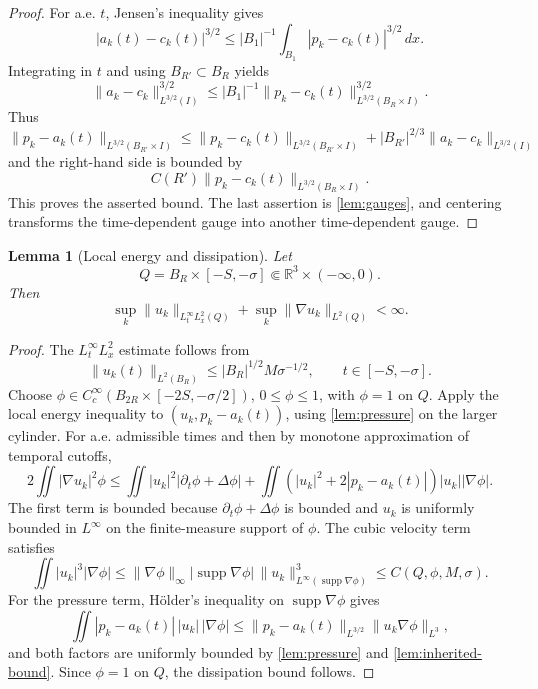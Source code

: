 \documentclass[11pt]{amsart}
\theoremstyle{plain}
\newtheorem{lemma}[theorem]{Lemma}
\theoremstyle{definition}
\theoremstyle{remark}
\numberwithin{equation}{section}
\newcommand{\R}{\mathbb R}
\newcommand{\supp}{\operatorname{supp}}
\begin{document}
\begin{proof}
For a.e. \(t\), Jensen's inequality gives
\[
   |a_k(t)-c_k(t)|^{3/2}
   \le |B_1|^{-1}\int_{B_1}|p_k-c_k(t)|^{3/2}\,dx .
\]
Integrating in \(t\) and using \(B_{R'}\subset B_R\) yields
\[
   \|a_k-c_k\|_{L^{3/2}(I)}^{3/2}
   \le
   |B_1|^{-1}\|p_k-c_k(t)\|_{L^{3/2}(B_R\times I)}^{3/2}.
\]
Thus
\[
   \|p_k-a_k(t)\|_{L^{3/2}(B_{R'}\times I)}
   \le
   \|p_k-c_k(t)\|_{L^{3/2}(B_{R'}\times I)}
   +|B_{R'}|^{2/3}\|a_k-c_k\|_{L^{3/2}(I)}
\]
and the right-hand side is bounded by
\[
   C(R')\|p_k-c_k(t)\|_{L^{3/2}(B_R\times I)} .
\]
This proves the asserted bound.
The last assertion is \cref{lem:gauges}, and centering transforms the
time-dependent gauge into another time-dependent gauge.
\end{proof}

\begin{lemma}[Local energy and dissipation]\label{lem:energy-diss}
Let
\[
   Q=B_R\times[-S,-\sigma]\Subset\R^3\times(-\infty,0).
\]
Then
\[
   \sup_k\|u_k\|_{L^\infty_tL^2_x(Q)}
   +\sup_k\|\nabla u_k\|_{L^2(Q)}<\infty .
\]
\end{lemma}

\begin{proof}
The \(L^\infty_tL^2_x\) estimate follows from
\[
   \|u_k(t)\|_{L^2(B_R)}
   \le |B_R|^{1/2}M\sigma^{-1/2},
   \qquad t\in[-S,-\sigma].
\]
Choose \(\phi\in C_c^\infty(B_{2R}\times[-2S,-\sigma/2])\), \(0\le\phi\le1\),
with \(\phi=1\) on \(Q\).  Apply the local energy inequality to
\((u_k,p_k-a_k(t))\), using \cref{lem:pressure} on the larger cylinder.  For
a.e. admissible times and then by monotone approximation of temporal cutoffs,
\[
   2\iint |\nabla u_k|^2\phi
   \le
   \iint |u_k|^2|\partial_t\phi+\Delta\phi|
   +\iint (|u_k|^2+2|p_k-a_k(t)|)|u_k||\nabla\phi|.
\]
The first term is bounded because \(\partial_t\phi+\Delta\phi\) is bounded
and \(u_k\) is uniformly bounded in \(L^\infty\) on the finite-measure support
of \(\phi\).  The cubic velocity term satisfies
\[
   \iint |u_k|^3|\nabla\phi|
   \le
   \|\nabla\phi\|_\infty
   |\supp\nabla\phi|\,\|u_k\|_{L^\infty(\supp\nabla\phi)}^3
   \le C(Q,\phi,M,\sigma).
\]
For the pressure term, H\"older's inequality on \(\supp\nabla\phi\) gives
\[
   \iint |p_k-a_k(t)|\,|u_k|\,|\nabla\phi|
   \le
   \|p_k-a_k(t)\|_{L^{3/2}}
   \|u_k\nabla\phi\|_{L^3},
\]
and both factors are uniformly bounded by \cref{lem:pressure} and
\cref{lem:inherited-bound}.  Since \(\phi=1\) on \(Q\), the dissipation bound
follows.
\end{proof}
\end{document}

